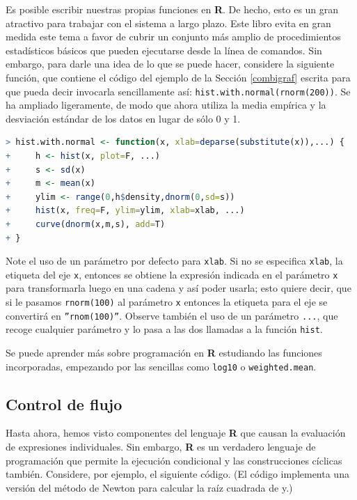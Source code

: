 Es posible escribir nuestras propias funciones en \textbf{R}. De hecho, esto es
un gran atractivo para trabajar con el sistema a largo plazo. Este libro evita
en gran medida este tema a favor de cubrir un conjunto más amplio de
procedimientos estadísticos básicos que pueden ejecutarse desde la línea de
comandos. Sin embargo, para darle una idea de lo que se puede hacer, considere
la siguiente función, que contiene el código del ejemplo de la Sección
\ref{combigraf} escrita para que pueda decir invocarla sencillamente así:
 \texttt{hist.with.normal(rnorm(200))}. Se ha ampliado ligeramente, de modo que
ahora utiliza la media empírica y la desviación estándar de los datos en lugar
de sólo 0 y 1.

\begin{lstlisting}[language=R]
> hist.with.normal <- function(x, xlab=deparse(substitute(x)),...) {
+     h <- hist(x, plot=F, ...)
+     s <- sd(x)
+     m <- mean(x)
+     ylim <- range(0,h$density,dnorm(0,sd=s))
+     hist(x, freq=F, ylim=ylim, xlab=xlab, ...)
+     curve(dnorm(x,m,s), add=T)
+ }
\end{lstlisting}

Note el uso de un parámetro por defecto para \texttt{xlab}. Si no se especifica
\texttt{xlab}, la etiqueta del eje \texttt{x}, entonces se obtiene la expresión
indicada en el parámetro \texttt{x} para transformarla luego en una cadena y así
poder usarla; esto quiere decir, que si le pasamos \texttt{rnorm(100)} al
parámetro \texttt{x} entonces la etiqueta para el eje se convertirá en
\texttt{''rnom(100)''}. Observe también el uso de un parámetro \texttt{...}, que
recoge cualquier parámetro  y lo pasa a las dos llamadas a la función
\texttt{hist}.

Se puede aprender más sobre programación en \textbf{R} estudiando las funciones
incorporadas, empezando por las sencillas como \texttt{log10} o
\texttt{weighted.mean}.

\subsection{Control de flujo} \label{flowcontrol}

Hasta ahora, hemos visto componentes del lenguaje \textbf{R} que causan la
evaluación de expresiones individuales. Sin embargo, \textbf{R} es un verdadero
lenguaje de programación que permite la ejecución condicional y las
construcciones cíclicas también. Considere, por ejemplo, el siguiente código.
(El código implementa una versión del método de Newton para calcular la raíz
cuadrada de y.)

